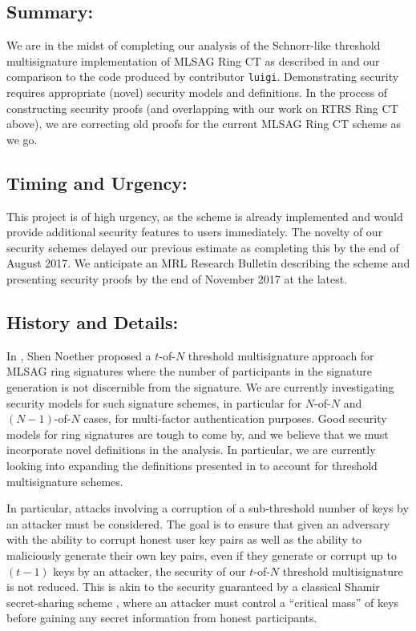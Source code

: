 \documentclass[12pt,english]{mrl}
\theoremstyle{definition}
\numberwithin{equation}{section}
\numberwithin{figure}{section}
\numberwithin{equation}{section}
\numberwithin{equation}{section}
\numberwithin{figure}{section}
\begin{document}
\subsection{Summary:} 

We are in the midst of completing our analysis of the Schnorr-like threshold multisignature implementation of MLSAG Ring CT as described in \cite{noether2016ring} and our comparison to the code produced by contributor \texttt{luigi}. Demonstrating security requires appropriate (novel) security models and definitions. In the process of constructing security proofs (and overlapping with our work on RTRS Ring CT above), we are correcting old proofs for the current MLSAG Ring CT scheme as we go.

\subsection{Timing and Urgency:} 

This project is of high urgency, as the scheme is already implemented and would provide additional security features to users immediately. The novelty of our security schemes delayed our previous estimate as completing this by the end of August 2017. We anticipate an MRL Research Bulletin describing the scheme and presenting security proofs by the end of November 2017 at the latest.

\subsection{History and Details:} 

In \cite{noether2016ring}, Shen Noether proposed a $t$-of-$N$ threshold multisignature approach for MLSAG ring signatures where the number of participants in the signature generation is not discernible from the signature. We are currently investigating security models for such signature schemes, in particular for $N$-of-$N$ and $(N-1)$-of-$N$ cases, for multi-factor authentication purposes. Good security models for ring signatures are tough to come by, and we believe that we must incorporate novel definitions in the analysis. In particular, we are currently looking into expanding the definitions presented in \cite{bender2006ring} to account for threshold multisignature schemes.

In particular, attacks involving a corruption of a sub-threshold number of keys by an attacker must be considered. The goal is to ensure that given an adversary with the ability to corrupt honest user key pairs as well as the ability to maliciously generate their own key pairs, even if they generate or corrupt up to $(t-1)$ keys by an attacker, the security of our $t$-of-$N$ threshold multisignature is not reduced. This is akin to the security guaranteed by a classical Shamir secret-sharing scheme \cite{shamir1979share}, where an attacker must control a ``critical mass'' of keys before gaining any secret information from honest participants.
\end{document}
